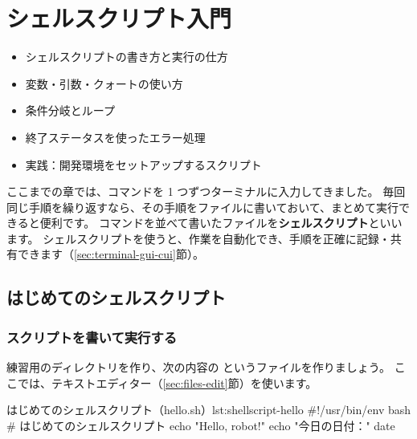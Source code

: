 \chapter{シェルスクリプト入門}
\label{chap:shellscript}

\begin{goalbox}
  \begin{itemize}
    \item シェルスクリプトの書き方と実行の仕方
    \item 変数・引数・クォートの使い方
    \item 条件分岐とループ
    \item 終了ステータスを使ったエラー処理
    \item 実践：開発環境をセットアップするスクリプト
  \end{itemize}
\end{goalbox}

ここまでの章では、コマンドを 1 つずつターミナルに入力してきました。
毎回同じ手順を繰り返すなら、その手順をファイルに書いておいて、まとめて実行できると便利です。
コマンドを並べて書いたファイルを\textbf{シェルスクリプト}といいます。
シェルスクリプトを使うと、作業を自動化でき、手順を正確に記録・共有できます（\ref{sec:terminal-gui-cui}節）。

\section{はじめてのシェルスクリプト}
\label{sec:shellscript-first}

\subsection{スクリプトを書いて実行する}

練習用のディレクトリを作り、次の内容の  というファイルを作りましょう。
ここでは、テキストエディター（\ref{sec:files-edit}節）を使います。


\begin{codelisting}[style=bash]{はじめてのシェルスクリプト（hello.sh）}{lst:shellscript-hello}
#!/usr/bin/env bash
# はじめてのシェルスクリプト
echo "Hello, robot!"
echo "今日の日付："
date
\end{codelisting}

